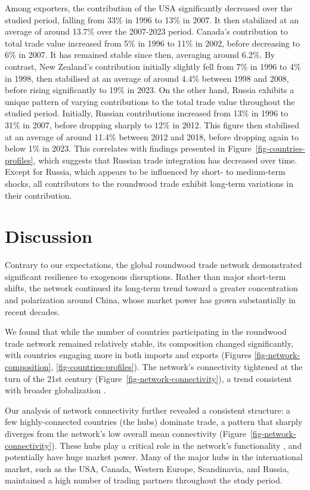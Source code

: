 \documentclass[
  authoryear,
  review,
  3p]{elsarticle}
\begin{document}
Among exporters, the contribution of the USA significantly decreased
over the studied period, falling from 33\% in 1996 to 13\% in 2007. It
then stabilized at an average of around 13.7\% over the 2007-2023
period. Canada's contribution to total trade value increased from 5\% in
1996 to 11\% in 2002, before decreasing to 6\% in 2007. It has remained
stable since then, averaging around 6.2\%. By contrast, New Zealand's
contribution initially slightly fell from 7\% in 1996 to 4\% in 1998,
then stabilised at an average of around 4.4\% between 1998 and 2008,
before rising significantly to 19\% in 2023. On the other hand, Russia
exhibits a unique pattern of varying contributions to the total trade
value throughout the studied period. Initially, Russian contributions
increased from 13\% in 1996 to 31\% in 2007, before dropping sharply to
12\% in 2012. This figure then stabilised at an average of around 11.4\%
between 2012 and 2018, before dropping again to below 1\% in 2023. This
correlates with findings presented in
Figure~\ref{fig-countries-profiles}, which suggests that Russian trade
integration has decreased over time. Except for Russia, which appears to
be influenced by short- to medium-term shocks, all contributors to the
roundwood trade exhibit long-term variations in their contribution.

\section{Discussion}\label{discussion}

Contrary to our expectations, the global roundwood trade network
demonstrated significant resilience to exogenous disruptions. Rather
than major short-term shifts, the network continued its long-term trend
toward a greater concentration and polarization around China, whose
market power has grown substantially in recent decades.

We found that while the number of countries participating in the
roundwood trade network remained relatively stable, its composition
changed significantly, with countries engaging more in both imports and
exports (Figures \ref{fig-network-composition},
\ref{fig-countries-profiles}). The network's connectivity tightened at
the turn of the 21st century (Figure~\ref{fig-network-connectivity}), a
trend consistent with broader globalization
\citep{prestemon_international_2003}.

Our analysis of network connectivity further revealed a consistent
structure: a few highly-connected countries (the hubs) dominate trade, a
pattern that sharply diverges from the network's low overall mean
connectivity (Figure~\ref{fig-network-connectivity}). These hubs play a
critical role in the network's functionality \citep{huang_static_2024},
and potentially have huge market power. Many of the major hubs in the
international market, such as the USA, Canada, Western Europe,
Scandinavia, and Russia, maintained a high number of trading partners
throughout the study period.
\end{document}
